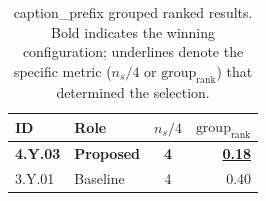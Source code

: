 \begin{table}[ht]
\centering
\footnotesize
\caption{{caption_prefix} grouped ranked results. Bold indicates the winning configuration; underlines denote the specific metric ($n_s/4$ or $\text{group}_{\text{rank}}$) that determined the selection.}
\label{tab:final_obj_comparison_grouped_ranked}
\begin{tabular}{@{}llcr@{}}
\hline
    \textbf{ID} & \textbf{Role} & \textbf{$n_s/4$} & \textbf{$\text{group}_{\text{rank}}$} \\
\hline
    \textbf{4.Y.03} & \textbf{Proposed} & \textbf{4} & \textbf{\underline{0.18}} \\
    3.Y.01 & Baseline & 4 & 0.40 \\
\hline
\end{tabular}
\end{table}